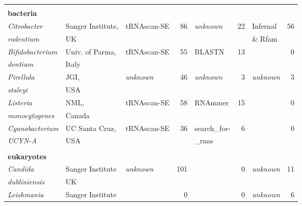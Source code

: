 \begin{footnotesize}
\begin{table}
\begin{center}
\begin{tabular}{|ll|lr|lr|lr|}
& & & & & & & \\
\multicolumn{8}{l}{\textbf{bacteria}} \\ \hline
\emph{Citrobacter}                       & Sanger Institute, & tRNAscan-SE   & 86       & \emph{unknown} & 22 & Infernal       & 56       \\
\emph{rodentium}                         & UK                &               &          &                &    & \& Rfam        &          \\ \hline
\emph{Bifidobacterium}                   & Univ. of Parma,   & tRNAscan-SE   & 55       & BLASTN         & 13 &                &  0       \\
\emph{dentium}                           & Italy             &               &          &                &    &                &          \\ \hline
\emph{Pirellula}                         & JGI,              &\emph{unknown} & 46       & \emph{unknown} &  3 & \emph{unknown} & 3        \\
\emph{staleyi}                           & USA               &               &          &                &    &                &          \\ \hline %
\emph{Listeria}                          & NML,              & tRNAscan-SE   & 58       & RNAmmer        & 15 &                & 0        \\
\emph{monocytogenes}                     & Canada            &               &          &                &    &                &          \\ \hline
\emph{Cyanobacterium}                    & UC Santa Cruz,    & tRNAscan-SE   & 36       & search\_for-   & 6  &                & 0        \\
\emph{UCYN-A}                            & USA               &               &          & \_rnas         &    &                &          \\ \hline
& & & & & & & \\
\multicolumn{8}{l}{\textbf{eukaryotes}} \\ \hline
\emph{Candida}                           & Sanger Institute  &\emph{unknown} &     101  &                & 0  & \emph{unknown} & 11       \\
\emph{dubliniensis}                      & UK                &               &          &                &    &                &          \\ \hline
\emph{Leishmania}                        & Sanger Institute  &               &       0  &                &  0 & \emph{unknown} & 6        \\

\end{tabular}
\end{center}
\end{table}
\end{footnotesize}
